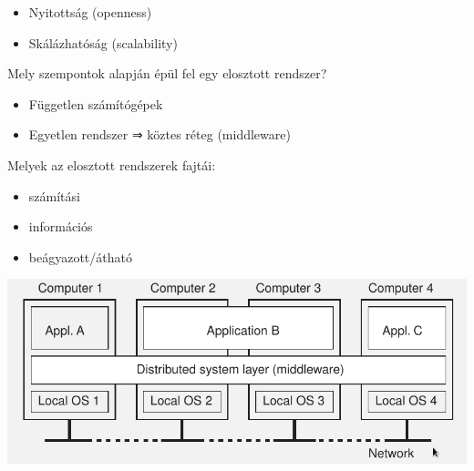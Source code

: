 \documentclass[12pt]{article}
\begin{document}
\begin{description}[style=unboxed]
\begin{itemize}
            \item Nyitottság (openness)
            \item Skálázhatóság (scalability)
        \end{itemize}
    \item  Mely szempontok alapján épül fel egy elosztott rendszer?
        \begin{itemize}
            \item Független számítógépek
            \item Egyetlen rendszer ⇒ köztes réteg (middleware)
        \end{itemize}
    \item
        Melyek az elosztott rendszerek fajtái:
        \begin{itemize}
            \item
                számítási
            \item
                információs
            \item
                beágyazott/átható
        \end{itemize}
        \begin{center}
            \includegraphics[scale=0.5]{images/ElosztottRendszer.png}
        \end{center}
\end{description}
\end{document}
